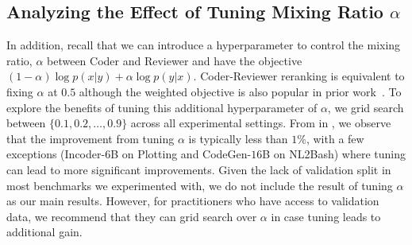 \documentclass[nohyperref]{article}
\theoremstyle{plain}
\theoremstyle{definition}
\theoremstyle{remark}
\begin{document}
\subsection{Analyzing the Effect of Tuning Mixing Ratio $\alpha$}
\label{sec:app-alpha-tuning}

In addition, recall that we can introduce a hyperparameter to control the mixing ratio, $\alpha$ between Coder and Reviewer and have the objective $(1-\alpha)\log p(x|y) + \alpha\log p(y|x)$.
Coder-Reviewer reranking is equivalent to fixing $\alpha$ at $0.5$ although the weighted objective is also popular in prior work~\citep{mmi-diversity}.
To explore the benefits of tuning this additional hyperparameter of $\alpha$, we grid search between $\{0.1, 0.2, \ldots, 0.9\}$ across all experimental settings.
From  in , we observe that the improvement from tuning $\alpha$ is typically less than $1\%$, with a few exceptions (Incoder-$6$B on Plotting and CodeGen-$16$B on NL2Bash) where tuning can lead to more significant improvements.
Given the lack of validation split in most benchmarks we experimented with, we do not include the result of tuning $\alpha$ as our main results.
However, for practitioners who have access to validation data, we recommend that they can grid search over $\alpha$ in case tuning leads to additional gain.
\end{document}
